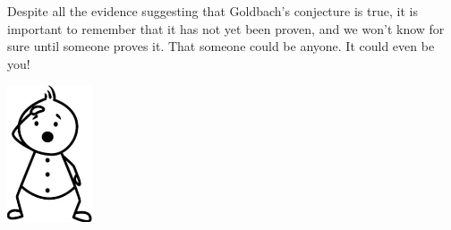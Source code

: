 \documentclass{article}
\begin{document}
Despite all the evidence suggesting that Goldbach’s conjecture is true, it is important to remember that it has not yet been proven, and we won’t know for sure until someone proves it. That someone could be anyone. It could even be you!
\begin{center}
    \includegraphics[width=1in]{images/stick_figure1.png}
\end{center}
\end{document}
